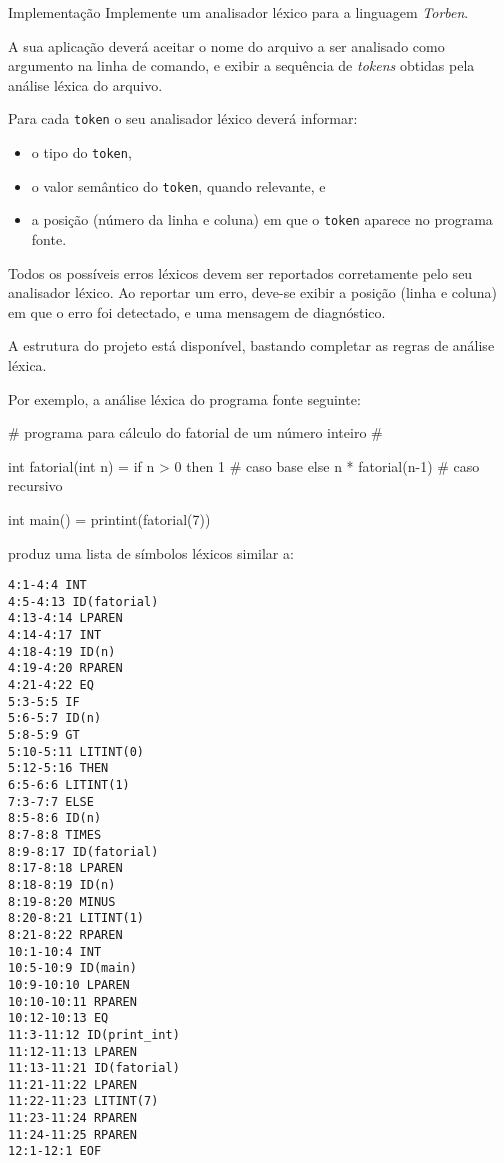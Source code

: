 \documentclass[a4paper,10pt,brazil]{article}
\newcommand{\lang}{\textsl{Torben}}
\begin{document}
\begin{task}[breakable]{Implementação}{}
  Implemente um analisador léxico para a linguagem \lang{}.

  A sua aplicação deverá aceitar o nome do arquivo a ser analisado como
  argumento na linha de comando, e exibir a sequência de \emph{tokens}
  obtidas pela análise léxica do arquivo.

  Para cada \texttt{token} o seu analisador léxico deverá informar:
  \begin{itemize}
    \item o tipo do \texttt{token},
    \item o valor semântico do \texttt{token}, quando relevante, e
    \item a posição (número da linha e coluna) em que o \texttt{token}
    aparece no programa fonte.
  \end{itemize}

  Todos os possíveis erros léxicos devem ser reportados corretamente
  pelo seu analisador léxico. Ao reportar um erro, deve-se exibir a
  posição (linha e coluna) em que o erro foi detectado, e uma mensagem
  de diagnóstico.

  A estrutura do projeto está disponível, bastando completar as regras
  de análise léxica.

  Por exemplo, a análise léxica do programa fonte seguinte:
  \begin{pygmented}[lang=text]
{# programa para cálculo do fatorial
   de um número inteiro #}

int fatorial(int n) =
  if n > 0 then
    1                           # caso base
  else
    n * fatorial(n-1)           # caso recursivo

int main() =
  printint(fatorial(7))
  \end{pygmented}
  \noindent produz uma lista de símbolos léxicos similar a:
  \begin{verbatim}
4:1-4:4 INT
4:5-4:13 ID(fatorial)
4:13-4:14 LPAREN
4:14-4:17 INT
4:18-4:19 ID(n)
4:19-4:20 RPAREN
4:21-4:22 EQ
5:3-5:5 IF
5:6-5:7 ID(n)
5:8-5:9 GT
5:10-5:11 LITINT(0)
5:12-5:16 THEN
6:5-6:6 LITINT(1)
7:3-7:7 ELSE
8:5-8:6 ID(n)
8:7-8:8 TIMES
8:9-8:17 ID(fatorial)
8:17-8:18 LPAREN
8:18-8:19 ID(n)
8:19-8:20 MINUS
8:20-8:21 LITINT(1)
8:21-8:22 RPAREN
10:1-10:4 INT
10:5-10:9 ID(main)
10:9-10:10 LPAREN
10:10-10:11 RPAREN
10:12-10:13 EQ
11:3-11:12 ID(print_int)
11:12-11:13 LPAREN
11:13-11:21 ID(fatorial)
11:21-11:22 LPAREN
11:22-11:23 LITINT(7)
11:23-11:24 RPAREN
11:24-11:25 RPAREN
12:1-12:1 EOF
  \end{verbatim}
\end{task}
\end{document}

